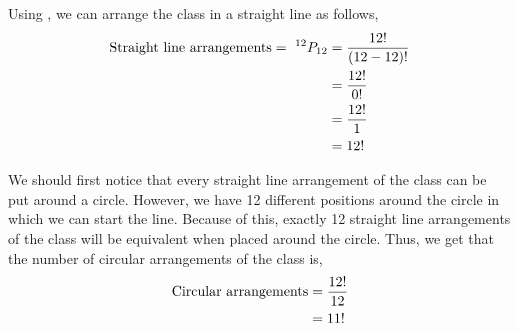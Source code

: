 %
%


\begin{subquestions}
	
\subquestion

\begin{subsubquestions}
	
\subsubquestion


Using , we can arrange the class in a straight line as follows,
\begin{align}
	\text{Straight line arrangements} = ~^{12}P_{12} & = \frac{12!}{(12-12)!} \nonumber \\
	            & = \frac{12!}{0!} \nonumber \\
	            & = \frac{12!}{1} \nonumber \\
	            & = 12!
\end{align}
	

\subsubquestion

We should first notice that every straight line arrangement of the class can be put around a circle. However, we have 12 different positions around the circle in which we can start the line. Because of this, exactly 12 straight line arrangements of the class will be equivalent when placed around the circle. Thus, we get that the number of circular arrangements of the class is,
\begin{align}
	\text{Circular arrangements} & = \frac{12!}{12} \nonumber \\
	& = 11! 
\end{align}
	


\end{subsubquestions}
\end{subquestions}
